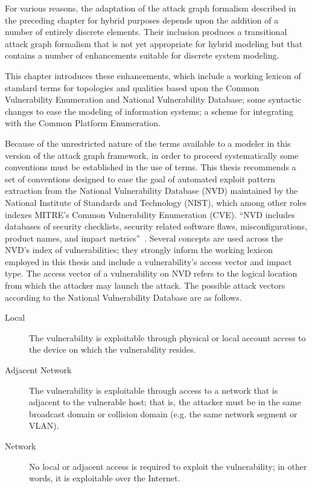 For various reasons, the adaptation of the attack graph formalism described in
the preceding chapter for hybrid purposes depends upon the addition of a number
of entirely discrete elements. Their inclusion produces a transitional
attack graph formalism that is not yet appropriate for hybrid modeling but that
contains a number of enhancements suitable for discrete system modeling.

This chapter introduces these enhancements, which include a working lexicon of
standard terms for topologies and qualities based upon the Common Vulnerability
Enumeration and National Vulnerability Database; some syntactic
changes to ease the modeling of information systems; a scheme for integrating with
the Common Platform Enumeration.

Because of the unrestricted nature of the terms available to a modeler
in this version of the attack graph framework, in order to proceed systematically
some conventions must be established in the use of terms. This thesis recommends
a set of conventions designed to ease the goal of automated exploit pattern extraction
from the National Vulnerability Database (NVD) maintained by the 
National Institute of Standards and Technology (NIST), which among other roles
indexes MITRE's Common Vulnerability Enumeration (CVE). ``NVD includes 
databases of security checklists, security related software flaws, 
misconfigurations, product names, and impact metrics''~\cite{nvdhome}.
Several concepts are used across the NVD's index of vulnerabilities; they
strongly inform the working lexicon employed in this thesis and include
a vulnerability's access vector and impact type.
The access vector of a vulnerability on NVD refers to the logical location from
which the attacker may launch the attack. The possible attack vectors according
to the National Vulnerability Database are as follows.
\begin{description}
\item[Local] The vulnerability is exploitable through physical or local account access
    to the device on which the vulnerability resides.
\item[Adjacent Network] The vulnerability is exploitable through access to a network
    that is adjacent to the vulnerable host; that is, the attacker must be in the same
    broadcast domain or collision domain (e.g. the same network segment or VLAN).
\item[Network] No local or adjacent access is required to exploit the vulnerability;
    in other words, it is exploitable over the Internet.
\end{description}
